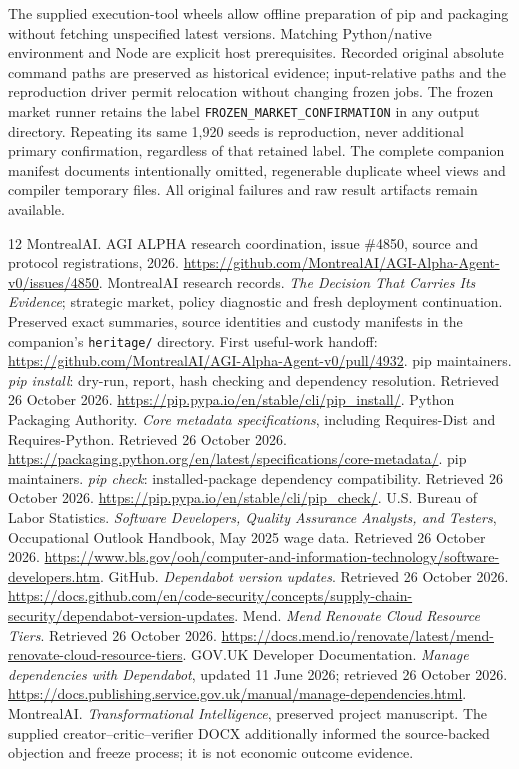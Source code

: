 \documentclass[11pt,letterpaper]{article}
\begin{document}
The supplied execution-tool wheels allow offline preparation of pip and packaging without fetching unspecified latest versions. Matching Python/native environment and Node are explicit host prerequisites. Recorded original absolute command paths are preserved as historical evidence; input-relative paths and the reproduction driver permit relocation without changing frozen jobs. The frozen market runner retains the label \texttt{FROZEN\_MARKET\_CONFIRMATION} in any output directory. Repeating its same 1,920 seeds is reproduction, never additional primary confirmation, regardless of that retained label. The complete companion manifest documents intentionally omitted, regenerable duplicate wheel views and compiler temporary files. All original failures and raw result artifacts remain available.

\begin{thebibliography}{12}
\small
\setlength{\itemsep}{3pt}
\setlength{\parskip}{0pt}
 MontrealAI. AGI ALPHA research coordination, issue \#4850, source and protocol registrations, 2026. \url{https://github.com/MontrealAI/AGI-Alpha-Agent-v0/issues/4850}.
 MontrealAI research records. \emph{The Decision That Carries Its Evidence}; strategic market, policy diagnostic and fresh deployment continuation. Preserved exact summaries, source identities and custody manifests in the companion's \texttt{heritage/} directory. First useful-work handoff: \url{https://github.com/MontrealAI/AGI-Alpha-Agent-v0/pull/4932}.
 pip maintainers. \emph{pip install}: dry-run, report, hash checking and dependency resolution. Retrieved 26 October 2026. \url{https://pip.pypa.io/en/stable/cli/pip_install/}.
 Python Packaging Authority. \emph{Core metadata specifications}, including Requires-Dist and Requires-Python. Retrieved 26 October 2026. \url{https://packaging.python.org/en/latest/specifications/core-metadata/}.
 pip maintainers. \emph{pip check}: installed-package dependency compatibility. Retrieved 26 October 2026. \url{https://pip.pypa.io/en/stable/cli/pip_check/}.
 U.S. Bureau of Labor Statistics. \emph{Software Developers, Quality Assurance Analysts, and Testers}, Occupational Outlook Handbook, May 2025 wage data. Retrieved 26 October 2026. \url{https://www.bls.gov/ooh/computer-and-information-technology/software-developers.htm}.
 GitHub. \emph{Dependabot version updates}. Retrieved 26 October 2026. \url{https://docs.github.com/en/code-security/concepts/supply-chain-security/dependabot-version-updates}.
 Mend. \emph{Mend Renovate Cloud Resource Tiers}. Retrieved 26 October 2026. \url{https://docs.mend.io/renovate/latest/mend-renovate-cloud-resource-tiers}.
 GOV.UK Developer Documentation. \emph{Manage dependencies with Dependabot}, updated 11 June 2026; retrieved 26 October 2026. \url{https://docs.publishing.service.gov.uk/manual/manage-dependencies.html}.
 MontrealAI. \emph{Transformational Intelligence}, preserved project manuscript. The supplied creator--critic--verifier DOCX additionally informed the source-backed objection and freeze process; it is not economic outcome evidence.
\end{thebibliography}
\end{document}
